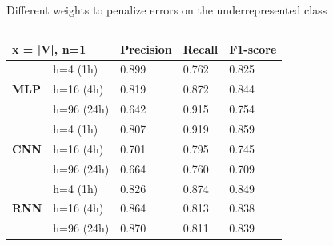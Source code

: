 Different weights to penalize errors on the underrepresented class
\begin{table}[H]
\centering
\begin{tabular}{|ll|l|l|l|}
\hline
\multicolumn{2}{|l|}{x = |V|, n=1} & \textbf{Precision} & \textbf{Recall} & \textbf{F1-score} \\ \hline
\multicolumn{1}{|l|}{\multirow{3}{*}{\textbf{MLP}}} & h=4 (1h)   & 0.899 & 0.762 & 0.825 \\ \cline{2-5} 
\multicolumn{1}{|l|}{}                              & h=16 (4h)  & 0.819 & 0.872 & 0.844 \\ \cline{2-5} 
\multicolumn{1}{|l|}{}                              & h=96 (24h) & 0.642 & 0.915 & 0.754 \\ \hline
\multicolumn{1}{|l|}{\multirow{3}{*}{\textbf{CNN}}} & h=4 (1h)   & 0.807 & 0.919 & 0.859 \\ \cline{2-5} 
\multicolumn{1}{|l|}{}                              & h=16 (4h)  & 0.701 & 0.795 & 0.745 \\ \cline{2-5} 
\multicolumn{1}{|l|}{}                              & h=96 (24h) & 0.664 & 0.760 & 0.709 \\ \hline
\multicolumn{1}{|l|}{\multirow{3}{*}{\textbf{RNN}}} & h=4 (1h)   & 0.826 & 0.874 & 0.849 \\ \cline{2-5} 
\multicolumn{1}{|l|}{}                              & h=16 (4h)  & 0.864 & 0.813 & 0.838 \\ \cline{2-5} 
\multicolumn{1}{|l|}{}                              & h=96 (24h) & 0.870 & 0.811 & 0.839 \\ \hline
\end{tabular}
\caption{}
\label{tab:my-table}
\end{table}



